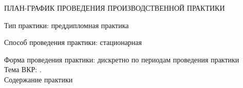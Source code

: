 

\graphicspath{{images/}}




\setcounter{page}{2}
\pagestyle{plain} %

\begin{center}
    \bf
    \small

    ПЛАН-ГРАФИК ПРОВЕДЕНИЯ ПРОИЗВОДСТВЕННОЙ ПРАКТИКИ
\end{center}

Тип практики: преддипломная практика


Способ проведения практики: стационарная


Форма проведения практики: дискретно по периодам проведения практики \\

Тема ВКР: \topicname. \\

Содержание практики

